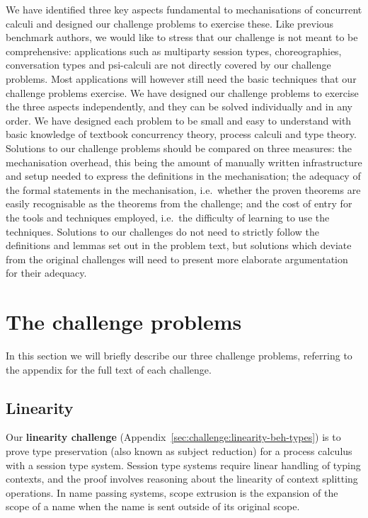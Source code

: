 \documentclass[runningheads]{llncs}
\begin{document}
We have identified three key aspects fundamental to mechanisations of concurrent calculi and designed our challenge problems to exercise these.
Like previous benchmark authors, we would like to stress that our challenge is not meant to be comprehensive: applications such as multiparty session types, choreographies, conversation types and psi-calculi are not directly covered by our challenge problems.
Most applications will however still need the basic techniques that our challenge problems exercise.
We have designed our challenge problems to exercise the three aspects independently, and they can be solved individually and in any order.
We have designed each problem to be small and easy to understand with basic knowledge of textbook concurrency theory, process calculi and type theory.
Solutions to our challenge problems should be compared on three measures: the mechanisation overhead, this being the amount of manually written infrastructure and setup needed to express the definitions in the mechanisation; the adequacy of the formal statements in the mechanisation, i.e.\ whether the proven theorems are easily recognisable as the theorems from the challenge; and the cost of entry for the tools and techniques employed, i.e.\ the difficulty of learning to use the techniques.
Solutions to our challenges do not need to strictly follow the definitions and lemmas set out in the problem text, but solutions which deviate from the original challenges will need to present more elaborate argumentation for their adequacy.

\section{The challenge problems}
In this section we will briefly describe our three challenge problems, referring to the appendix for the full text of each challenge.

\subsection{Linearity}
Our \textbf{linearity challenge} (Appendix~\ref{sec:challenge:linearity-beh-types}) is to prove type preservation (also known as subject reduction) for a process calculus with a session type system.
Session type systems require linear handling of typing contexts, and the proof involves reasoning about the linearity of context splitting operations.
In name passing systems, scope extrusion is the expansion of the scope of a name when the name is sent outside of its original scope.
\end{document}
